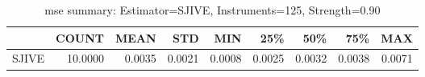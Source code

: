 \begin{table}[ht]
\centering
\caption{mse summary: Estimator=SJIVE, Instruments=125, Strength=0.90}
\begin{tabular}{lrrrrrrrr}
\toprule
 & COUNT & MEAN & STD & MIN & 25\% & 50\% & 75\% & MAX \\
\midrule
SJIVE & 10.0000 & 0.0035 & 0.0021 & 0.0008 & 0.0025 & 0.0032 & 0.0038 & 0.0071 \\
\bottomrule
\end{tabular}
\end{table}
